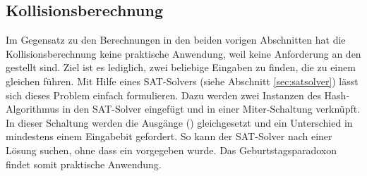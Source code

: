 \subsection{Kollisionsberechnung}
\label{sec:kollisionsberechnung}
Im Gegensatz zu den Berechnungen in den beiden vorigen Abschnitten hat die Kollisionsberechnung keine praktische Anwendung, weil keine Anforderung an
den  gestellt sind. Ziel ist es lediglich, zwei beliebige Eingaben zu finden, die zu einem gleichen  führen. Mit Hilfe eines SAT-Solvers
(siehe Abschnitt \ref{sec:satsolver}) lässt sich dieses Problem einfach formulieren. Dazu werden zwei Instanzen des Hash-Algorithmus in den SAT-Solver eingefügt
und in einer Miter-Schaltung \cite{mitergraph} verknüpft. In dieser Schaltung werden die Ausgänge () gleichgesetzt und ein Unterschied in mindestens
einem Eingabebit gefordert. So kann der SAT-Solver nach einer Lösung suchen, ohne dass ein  vorgegeben wurde. Das Geburtstagsparadoxon findet somit
praktische Anwendung.